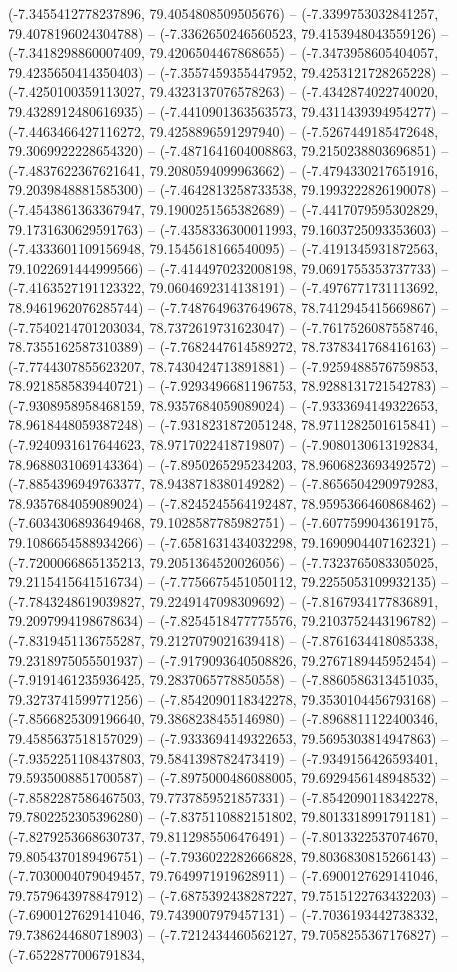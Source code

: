 (-7.3455412778237896, 79.4054808509505676) -- (-7.3399753032841257, 79.4078196024304788) -- (-7.3362650246560523, 79.4153948043559126) -- (-7.3418298860007409, 79.4206504467868655) -- (-7.3473958605404057, 79.4235650414350403) -- (-7.3557459355447952, 79.4253121728265228) -- (-7.4250100359113027, 79.4323137076578263) -- (-7.4342874022740020, 79.4328912480616935) -- (-7.4410901363563573, 79.4311439394954277) -- (-7.4463466427116272, 79.4258896591297940) -- (-7.5267449185472648, 79.3069922228654320) -- (-7.4871641604008863, 79.2150238803696851) -- (-7.4837622367621641, 79.2080594099963662) -- (-7.4794330217651916, 79.2039848881585300) -- (-7.4642813258733538, 79.1993222826190078) -- (-7.4543861363367947, 79.1900251565382689) -- (-7.4417079595302829, 79.1731630629591763) -- (-7.4358336300011993, 79.1603725093353603) -- (-7.4333601109156948, 79.1545618166540095) -- (-7.4191345931872563, 79.1022691444999566) -- (-7.4144970232008198, 79.0691755353737733) -- (-7.4163527191123322, 79.0604692314138191) -- (-7.4976771731113692, 78.9461962076285744) -- (-7.7487649637649678, 78.7412945415669867) -- (-7.7540214701203034, 78.7372619731623047) -- (-7.7617526087558746, 78.7355162587310389) -- (-7.7682447614589272, 78.7378341768416163) -- (-7.7744307855623207, 78.7430424713891881) -- (-7.9259488576759853, 78.9218585839440721) -- (-7.9293496681196753, 78.9288131721542783) -- (-7.9308958958468159, 78.9357684059089024) -- (-7.9333694149322653, 78.9618448059387248) -- (-7.9318231872051248, 78.9711282501615841) -- (-7.9240931617644623, 78.9717022418719807) -- (-7.9080130613192834, 78.9688031069143364) -- (-7.8950265295234203, 78.9606823693492572) -- (-7.8854396949763377, 78.9438718380149282) -- (-7.8656504290979283, 78.9357684059089024) -- (-7.8245245564192487, 78.9595366460868462) -- (-7.6034306893649468, 79.1028587785982751) -- (-7.6077599043619175, 79.1086654588934266) -- (-7.6581631434032298, 79.1690904407162321) -- (-7.7200066865135213, 79.2051364520026056) -- (-7.7323765083305025, 79.2115415641516734) -- (-7.7756675451050112, 79.2255053109932135) -- (-7.7843248619039827, 79.2249147098309692) -- (-7.8167934177836891, 79.2097994198678634) -- (-7.8254518477775576, 79.2103752443196782) -- (-7.8319451136755287, 79.2127079021639418) -- (-7.8761634418085338, 79.2318975055501937) -- (-7.9179093640508826, 79.2767189445952454) -- (-7.9191461235936425, 79.2837065778850558) -- (-7.8860586313451035, 79.3273741599771256) -- (-7.8542090118342278, 79.3530104456793168) -- (-7.8566825309196640, 79.3868238455146980) -- (-7.8968811122400346, 79.4585637518157029) -- (-7.9333694149322653, 79.5695303814947863) -- (-7.9352251108437803, 79.5841398782473419) -- (-7.9349156426593401, 79.5935008851700587) -- (-7.8975000486088005, 79.6929456148948532) -- (-7.8582287586467503, 79.7737859521857331) -- (-7.8542090118342278, 79.7802252305396280) -- (-7.8375110882151802, 79.8013318991791181) -- (-7.8279253668630737, 79.8112985506476491) -- (-7.8013322537074670, 79.8054370189496751) -- (-7.7936022282666828, 79.8036830815266143) -- (-7.7030004079049457, 79.7649971919628911) -- (-7.6900127629141046, 79.7579643978847912) -- (-7.6875392438287227, 79.7515122763432203) -- (-7.6900127629141046, 79.7439007979457131) -- (-7.7036193442738332, 79.7386244680718903) -- (-7.7212434460562127, 79.7058255367176827) -- (-7.6522877006791834, 